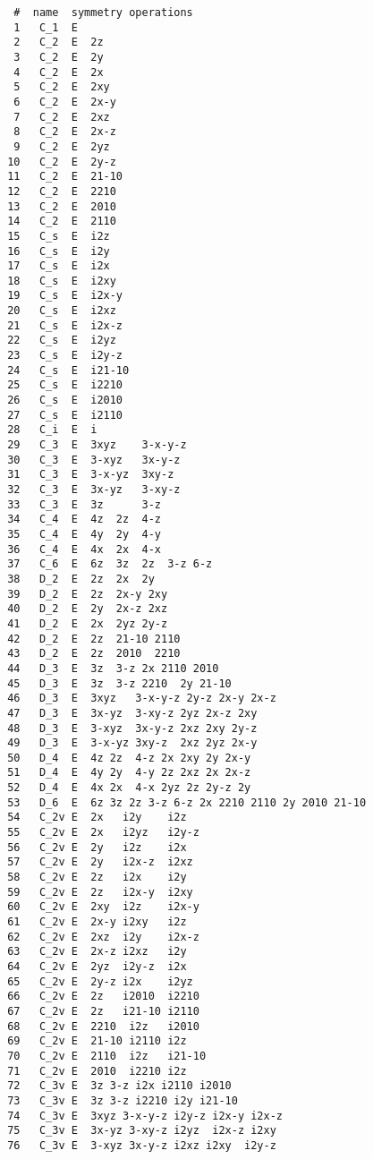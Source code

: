 \documentclass[12pt,a4paper,twoside]{report}
\begin{document}
\begin{tcolorbox}
\begin{footnotesize}
\begin{verbatim}
  #  name  symmetry operations
  1   C_1  E           
  2   C_2  E  2z       
  3   C_2  E  2y       
  4   C_2  E  2x       
  5   C_2  E  2xy      
  6   C_2  E  2x-y     
  7   C_2  E  2xz      
  8   C_2  E  2x-z     
  9   C_2  E  2yz      
 10   C_2  E  2y-z     
 11   C_2  E  21-10    
 12   C_2  E  2210     
 13   C_2  E  2010     
 14   C_2  E  2110     
 15   C_s  E  i2z      
 16   C_s  E  i2y      
 17   C_s  E  i2x      
 18   C_s  E  i2xy    
 19   C_s  E  i2x-y    
 20   C_s  E  i2xz     
 21   C_s  E  i2x-z    
 22   C_s  E  i2yz     
 23   C_s  E  i2y-z    
 24   C_s  E  i21-10   
 25   C_s  E  i2210    
 26   C_s  E  i2010    
 27   C_s  E  i2110    
 28   C_i  E  i        
 29   C_3  E  3xyz    3-x-y-z 
 30   C_3  E  3-xyz   3x-y-z  
 31   C_3  E  3-x-yz  3xy-z   
 32   C_3  E  3x-yz   3-xy-z  
 33   C_3  E  3z      3-z     
 34   C_4  E  4z  2z  4-z     
 35   C_4  E  4y  2y  4-y     
 36   C_4  E  4x  2x  4-x     
 37   C_6  E  6z  3z  2z  3-z 6-z 
 38   D_2  E  2z  2x  2y      
 39   D_2  E  2z  2x-y 2xy    
 40   D_2  E  2y  2x-z 2xz    
 41   D_2  E  2x  2yz 2y-z    
 42   D_2  E  2z  21-10 2110 
 43   D_2  E  2z  2010  2210 
 44   D_3  E  3z  3-z 2x 2110 2010   
 45   D_3  E  3z  3-z 2210  2y 21-10  
 46   D_3  E  3xyz   3-x-y-z 2y-z 2x-y 2x-z  
 47   D_3  E  3x-yz  3-xy-z 2yz 2x-z 2xy 
 48   D_3  E  3-xyz  3x-y-z 2xz 2xy 2y-z   
 49   D_3  E  3-x-yz 3xy-z  2xz 2yz 2x-y 
 50   D_4  E  4z 2z  4-z 2x 2xy 2y 2x-y 
 51   D_4  E  4y 2y  4-y 2z 2xz 2x 2x-z 
 52   D_4  E  4x 2x  4-x 2yz 2z 2y-z 2y 
 53   D_6  E  6z 3z 2z 3-z 6-z 2x 2210 2110 2y 2010 21-10 
 54   C_2v E  2x   i2y    i2z     
 55   C_2v E  2x   i2yz   i2y-z   
 56   C_2v E  2y   i2z    i2x     
 57   C_2v E  2y   i2x-z  i2xz    
 58   C_2v E  2z   i2x    i2y     
 59   C_2v E  2z   i2x-y  i2xy    
 60   C_2v E  2xy  i2z    i2x-y   
 61   C_2v E  2x-y i2xy   i2z     
 62   C_2v E  2xz  i2y    i2x-z   
 63   C_2v E  2x-z i2xz   i2y     
 64   C_2v E  2yz  i2y-z  i2x     
 65   C_2v E  2y-z i2x    i2yz    
 66   C_2v E  2z   i2010  i2210   
 67   C_2v E  2z   i21-10 i2110   
 68   C_2v E  2210  i2z   i2010   
 69   C_2v E  21-10 i2110 i2z     
 70   C_2v E  2110  i2z   i21-10  
 71   C_2v E  2010  i2210 i2z     
 72   C_3v E  3z 3-z i2x i2110 i2010 
 73   C_3v E  3z 3-z i2210 i2y i21-10  
 74   C_3v E  3xyz 3-x-y-z i2y-z i2x-y i2x-z 
 75   C_3v E  3x-yz 3-xy-z i2yz  i2x-z i2xy 
 76   C_3v E  3-xyz 3x-y-z i2xz i2xy  i2y-z  

\end{verbatim}
\end{footnotesize}
\end{tcolorbox}
\end{document}
